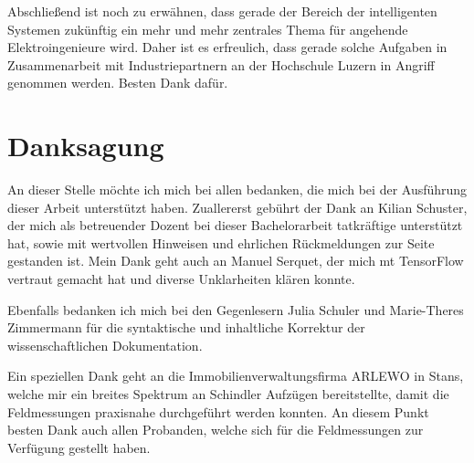 Abschließend ist noch zu erwähnen, dass gerade der Bereich der intelligenten Systemen zukünftig ein mehr und mehr zentrales Thema für angehende Elektroingenieure wird. Daher ist es erfreulich, dass gerade solche Aufgaben in Zusammenarbeit mit Industriepartnern an der Hochschule Luzern in Angriff genommen werden. Besten Dank dafür.



  



\section{Danksagung}

An dieser Stelle möchte ich mich bei allen bedanken, die mich bei der Ausführung dieser Arbeit unterstützt haben. 
Zuallererst gebührt der Dank an Kilian Schuster, der mich als betreuender Dozent bei dieser Bachelorarbeit tatkräftige unterstützt hat, sowie mit wertvollen Hinweisen und ehrlichen Rückmeldungen zur Seite gestanden ist. Mein Dank geht auch an Manuel Serquet, der mich mt TensorFlow vertraut gemacht hat und diverse Unklarheiten klären konnte. 

Ebenfalls bedanken ich mich bei den Gegenlesern Julia Schuler und Marie-Theres Zimmermann für die syntaktische und inhaltliche Korrektur der wissenschaftlichen Dokumentation.

Ein speziellen Dank geht an die Immobilienverwaltungsfirma ARLEWO in Stans, welche mir ein breites Spektrum an Schindler Aufzügen bereitstellte, damit die Feldmessungen praxisnahe durchgeführt werden konnten. An diesem Punkt besten Dank auch allen Probanden, welche sich für die Feldmessungen zur Verfügung gestellt haben.